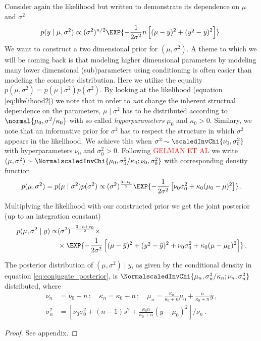 Consider again the likelihood but written to demonstrate its dependence on $\mu$ and $\sigma^2$
\begin{align}
  p(y \mid \mu, \sigma^2) \propto (\sigma^2)^{n/2} \EXP{-\frac{1}{2\sigma^2} n\left[ (\mu - \bar{y})^2 + (\bar{y^2} - \bar{y})^2 \right]} \,.
  \label{eq:likelihood2}
\end{align}
We want to construct a two dimensional prior for $(\mu, \sigma^2)$.
A theme to which we will be coming back is that modeling higher dimensional parameters by modeling many lower dimensional (sub)parameters using conditioning is often easier than modeling the complete distribution.
Here we utilize the equality $p(\mu, \sigma^2) = p(\mu \mid \sigma^2) p(\sigma^2)$.
By looking at the likelihood (equation \ref{eq:likelihood2}) we note that in order to \emph{not} change the inherent structual dependence on the parameters, $\mu \mid \sigma^2$ has to be distributed according to $\normal{\mu_0, \sigma^2 / \kappa_0}$ with so called \emph{hyperparameters} $\mu_0$ and $\kappa_0 > 0$.
Similary, we note that an informative prior for $\sigma^2$ has to respect the structure in which $\sigma^2$ appears in the likelihood.
We achieve this when $\sigma^2 \sim \scaledInvChi{\nu_0, \sigma_0^2}$ with hyperparameters $\nu_0$ and $\sigma_0^2 > 0$.
Following \textcolor{red}{GELMAN ET AL} we write $(\mu, \sigma^2) \sim \NormalscaledInvChi{\mu_0, \sigma_0^2 / \kappa_0; \nu_0, \sigma_0^2}$ with corresponding density function
\begin{align}
  p(\mu, \sigma^2) = p(\mu \mid \sigma^2) p(\sigma^2) \propto (\sigma^2)^{\frac{3 + \nu_0}{2}} \EXP{-\frac{1}{2\sigma^2} \left[\nu_0 \sigma_0^2 + \kappa_0(\mu_0 - \mu)^2 \right]} \,.
\end{align}

Multiplying the likelihood with our constructed prior we get the joint posterior (up to an integration constant)
\begin{align}
  p(\mu, \sigma^2 \mid y) \propto& (\sigma^2)^{-\frac{3 + n + \nu_0}{2}} \times\\
  & \times \EXP{-\frac{1}{2 \sigma^2} \left[ (\mu - \bar{y})^2 + (\bar{y^2} - \bar{y})^2 + \nu_0\sigma_0^2 + \kappa_0(\mu - \mu_0)^2 \right]} \,.
  \label{eq:conjugate_posterior}
\end{align}

\begin{proposition}
  The posterior distribution of $(\mu, \sigma^2) \mid y$, as given by the conditional density in equation \ref{eq:conjugate_posterior}, is $\NormalscaledInvChi{\mu_n, \sigma_n^2/\kappa_n; \nu_n, \sigma_n^2}$ distributed, where
  \begin{align*}
    \nu_n &= \nu_0 + n \,; \quad \kappa_n = \kappa_0 + n \,; \quad \mu_n =\frac{\kappa_0}{\kappa_0 + n}\mu_0 + \frac{n}{\kappa_0 + n}\bar{y} \,,\\
    \sigma_n^2 &= \left[\nu_0 \sigma_0^2 + (n-1)s^2 + \frac{\kappa_0 n}{\kappa_0 + n} (\bar{y} - \mu_0)^2\right] /\nu_n \,.
  \end{align*}
  \label{prop:posterior_conjugate}
\end{proposition}
\begin{proof}
  See appendix.
\end{proof}


